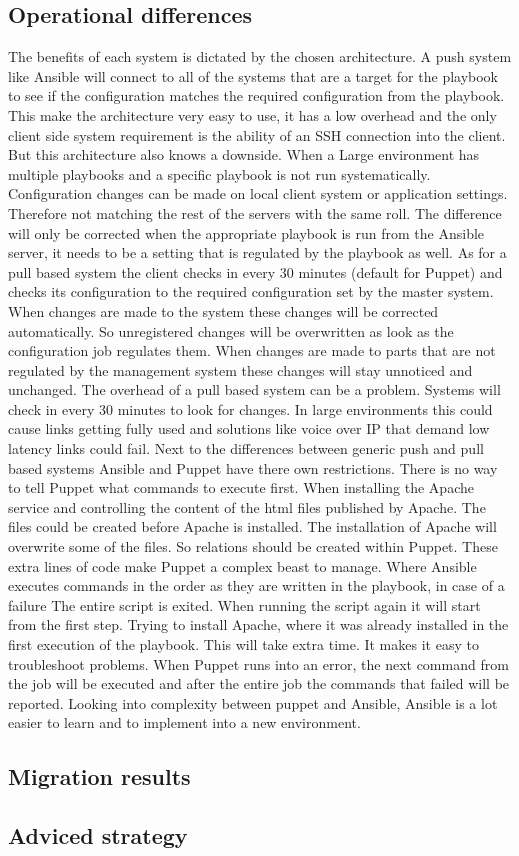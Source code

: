 \subsection{Operational differences}
The benefits of each system is dictated by the chosen architecture. A push system like Ansible will connect to all of the systems that are a target for the playbook to see if the configuration matches the required configuration from the playbook. This make the architecture very easy to use, it has a low overhead and the only client side system requirement is the ability of an SSH connection into the client. But this architecture also knows a downside. When a Large environment has multiple playbooks and a specific playbook is not run systematically. Configuration changes can be made on local client system or application settings. Therefore not matching the rest of the servers with the same roll. The difference will only be corrected when the appropriate playbook is run from the Ansible server, it needs to be a setting that is regulated by the playbook as well. As for a pull based system the client checks in every 30 minutes (default for Puppet) and checks its configuration to the required configuration set by the master system. When changes are made to the system these changes will be corrected automatically. So unregistered changes will be overwritten as look as the configuration job regulates them. When changes are made to parts that are not regulated by the management system these changes will stay unnoticed and unchanged. The overhead of a pull based system can be a problem. Systems will check in every 30 minutes to look for changes. In large environments this could cause links getting fully used and solutions like voice over IP that demand low latency links could fail. Next to the differences between generic push and pull based systems Ansible and Puppet have there own restrictions. There is no way to tell Puppet what commands to execute first. When installing the Apache service and controlling the content of the html files published by Apache. The files could be created before Apache is installed. The installation of Apache will overwrite some of the files. So relations should be created within Puppet. These extra lines of code make Puppet a complex beast to manage. Where Ansible executes commands in the order as they are written in the playbook, in case of a failure The entire script is exited. When running the script again it will start from the first step. Trying to install Apache, where it was already installed in the first execution of the playbook. This will take extra time. It makes it easy to troubleshoot problems. When Puppet runs into an error, the next command from the job will be executed and after the entire job the commands that failed will be reported. Looking into complexity between puppet and Ansible, Ansible is a lot easier to learn and to implement into a new environment.

\subsection{Migration results}

\subsection{Adviced strategy}
\cite{tecosystems_2013}
